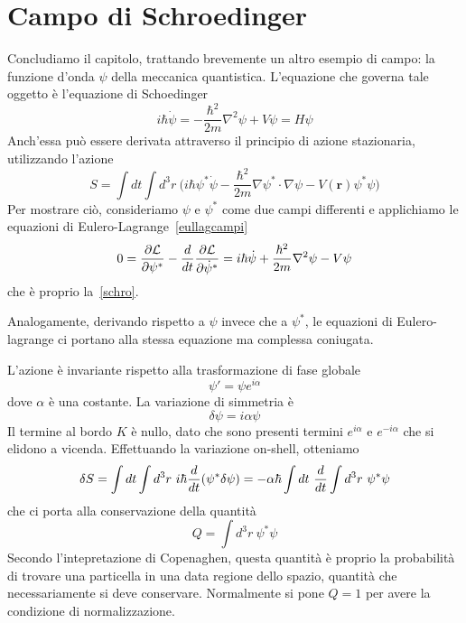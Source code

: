 \section{Campo di Schroedinger}

    Concludiamo il capitolo, trattando brevemente un altro esempio di campo: la funzione d'onda $\psi$ della meccanica quantistica. L'equazione che governa tale oggetto è l'equazione di Schoedinger
    \begin{equation} \label{schro}
        i \hbar \dot \psi = - \frac{\hbar^2}{2m} \nabla^2 \psi + V \psi = H \psi
    \end{equation}
    Anch'essa può essere derivata attraverso il principio di azione stazionaria, utilizzando l'azione 
    \begin{equation*}
        S = \int dt \int d^3 r ~ \Big( i \hbar \psi^* \dot \psi - \frac{\hbar^2}{2m} \nabla \psi^* \cdot \nabla \psi - V(\mathbf r) \psi^* \psi \Big)
    \end{equation*}
    Per mostrare ciò, consideriamo $\psi$ e $\psi^*$ come due campi differenti e applichiamo le equazioni di Eulero-Lagrange~\eqref{eullagcampi}
    \begin{equation*}
        0 = \frac{\partial\mathcal L}{\partial\psi^*} - \frac{d}{dt} \frac{\partial\mathcal L}{\partial\dot \psi^*} = i \hbar \dot \psi + \frac{\hbar^2}{2m} \nabla^2 \psi - V \psi 
    \end{equation*}
    che è proprio la~\eqref{schro}.

    Analogamente, derivando rispetto a $\psi$ invece che a $\psi^*$, le equazioni di Eulero-lagrange ci portano alla stessa equazione ma complessa coniugata. 

    \hfill

    L'azione è invariante rispetto alla trasformazione di fase globale 
\begin{equation*}
    \psi' = \psi e^{i\alpha}
\end{equation*}
    dove $\alpha$ è una costante. La variazione di simmetria è 
\begin{equation*}
    \delta \psi = i \alpha \psi
\end{equation*}
    Il termine al bordo $K$ è nullo, dato che sono presenti termini $e^{i\alpha}$ e $e^{-i\alpha}$ che si elidono a vicenda. Effettuando la variazione on-shell, otteniamo 
\begin{equation*}
    \delta S = \int dt \int d^3 r ~ i \hbar \frac{d}{dt} (\psi^* \delta \psi) = - \alpha \hbar \int dt ~ \frac{d}{dt} \int d^3 r ~ \psi^* \psi
\end{equation*}
    che ci porta alla conservazione della quantità
\begin{equation*}
    Q = \int d^3 r ~ \psi^* \psi
\end{equation*}
    Secondo l'intepretazione di Copenaghen, questa quantità è proprio la probabilità di trovare una particella in una data regione dello spazio, quantità che necessariamente si deve conservare. Normalmente si pone $Q = 1$ per avere la condizione di normalizzazione. 


